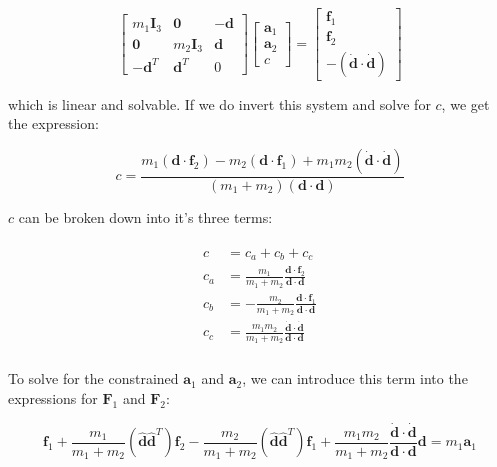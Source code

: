 \documentclass[]{article}
\begin{document}
	\begin{equation*}
		\begin{bmatrix}
			m_1 \mathbf{I}_3 & \mathbf{0} & -\mathbf{d} \\
			\mathbf{0} & m_2 \mathbf{I}_3 & \mathbf{d} \\
			-\mathbf{d}^T & \mathbf{d}^T & 0
		\end{bmatrix} \begin{bmatrix}
			\mathbf{a}_1 \\ \mathbf{a}_2 \\ c
		\end{bmatrix} = \begin{bmatrix}
			\mathbf{f}_1 \\ \mathbf{f}_2 \\ - (\dot{\mathbf{d}} \cdot \dot{\mathbf{d}})
		\end{bmatrix}
	\end{equation*}

	which is linear and solvable.  If we do invert this system and solve for $c$, we get the expression:

	\begin{equation*}
		c = \frac{m_1 (\mathbf{d}\cdot \mathbf{f}_2) - m_2 (\mathbf{d}\cdot \mathbf{f}_1) + m_1 m_2 (\dot{\mathbf{d}} \cdot \dot{\mathbf{d}})}{(m_1 + m_2) (\mathbf{d} \cdot \mathbf{d})}
	\end{equation*}

	$c$ can be broken down into it's three terms:

	\begin{align*}
	\begin{split}
		c &= c_a + c_b + c_c \\
		c_a &= \frac{m_1}{m_1 + m_2} \frac{\mathbf{d}\cdot \mathbf{f}_2}{\mathbf{d} \cdot \mathbf{d}} \\
		c_b &= -\frac{m_2}{m_1 + m_2} \frac{\mathbf{d}\cdot \mathbf{f}_1}{\mathbf{d} \cdot \mathbf{d}} \\
		c_c &= \frac{m_1 m_2}{m_1 + m_2} \frac{\dot{\mathbf{d}} \cdot \dot{\mathbf{d}}}{\mathbf{d} \cdot \mathbf{d}} \\
	\end{split}
	\end{align*}

	To solve for the constrained $\mathbf{a}_1$ and $\mathbf{a}_2$, we can introduce this term into the expressions for $\mathbf{F}_1$ and $\mathbf{F}_2$:

	\begin{equation*}
		\mathbf{f}_1 + \frac{m_1}{m_1 + m_2} \left( \hat{\mathbf{d}} \hat{\mathbf{d}}^T \right) \mathbf{f}_2 - \frac{m_2}{m_1 + m_2} \left( \hat{\mathbf{d}} \hat{\mathbf{d}}^T \right) \mathbf{f}_1 + \frac{m_1 m_2}{m_1 + m_2} \frac{\dot{\mathbf{d}} \cdot \dot{\mathbf{d}}}{\mathbf{d} \cdot \mathbf{d}} \mathbf{d} = m_1 \mathbf{a}_1
	\end{equation*}
\end{document}
